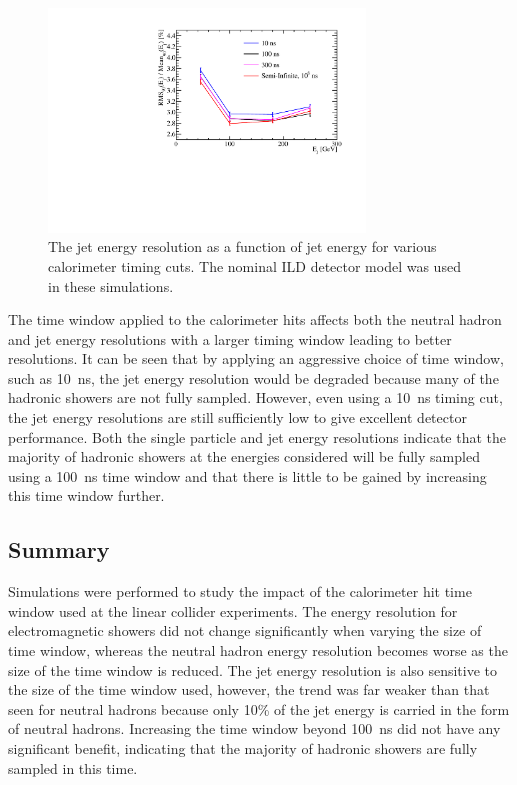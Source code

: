 \begin{figure}[h!]
\includegraphics[width=0.75\textwidth]{EnergyEstimators/Plots/TimingCuts/JER_vs_JetEnergy_TimingCutStudies.pdf}
\caption[The jet energy resolution as a function of jet energy for various calorimeter timing cuts.  The nominal ILD detector model was used in these simulations.]{The jet energy resolution as a function of jet energy for various calorimeter timing cuts.  The nominal ILD detector model was used in these simulations.}
\label{fig:jertimingcuts}
\end{figure}

The time window applied to the calorimeter hits affects both the neutral hadron and jet energy resolutions with a larger timing window leading to better resolutions.  It can be seen that by applying an aggressive choice of time window, such as 10~ns, the jet energy resolution would be degraded because many of the hadronic showers are not fully sampled.  However, even using a 10~ns timing cut, the jet energy resolutions are still sufficiently low to give excellent detector performance.  Both the single particle and jet energy resolutions indicate that the majority of hadronic showers at the energies considered will be fully sampled using a 100~ns time window and that there is little to be gained by increasing this time window further.


\subsection{Summary}
Simulations were performed to study the impact of the calorimeter hit time window used at the linear collider experiments.  The energy resolution for electromagnetic showers did not change significantly when varying the size of time window, whereas the neutral hadron energy resolution becomes worse as the size of the time window is reduced.  The jet energy resolution is also sensitive to the size of the time window used, however, the trend was far weaker than that seen for neutral hadrons because only 10\% of the jet energy is carried in the form of neutral hadrons.  Increasing the time window beyond 100~ns did not have any significant benefit, indicating that the majority of hadronic {showers} are fully sampled in this time.   

